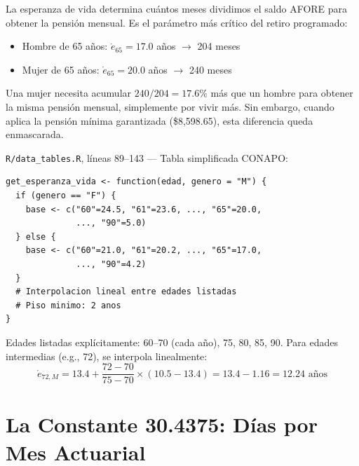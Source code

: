 \documentclass[11pt,a4paper]{report}
\theoremstyle{remark}
\begin{document}
\begin{tcolorbox}[colback=green!5!white, colframe=green!50!black, title=\textbf{Intuici\'on}]
La esperanza de vida determina cu\'antos meses dividimos el saldo AFORE para obtener la pensi\'on mensual. Es el par\'ametro m\'as cr\'itico del retiro programado:
\begin{itemize}
  \item Hombre de 65 a\~nos: $\mathring{e}_{65} = 17.0$ a\~nos $\to$ 204 meses
  \item Mujer de 65 a\~nos: $\mathring{e}_{65} = 20.0$ a\~nos $\to$ 240 meses
\end{itemize}

Una mujer necesita acumular $240/204 = 17.6\%$ m\'as que un hombre para obtener la misma pensi\'on mensual, simplemente por vivir m\'as. Sin embargo, cuando aplica la pensi\'on m\'inima garantizada (\$8,598.65), esta diferencia queda enmascarada.
\end{tcolorbox}

\begin{tcolorbox}[colback=orange!5!white, colframe=orange!75!black, title=\textbf{Aplicaci\'on en C\'odigo}]
\texttt{R/data\_tables.R}, l\'ineas 89--143 --- Tabla simplificada CONAPO:
\begin{lstlisting}
get_esperanza_vida <- function(edad, genero = "M") {
  if (genero == "F") {
    base <- c("60"=24.5, "61"=23.6, ..., "65"=20.0,
              ..., "90"=5.0)
  } else {
    base <- c("60"=21.0, "61"=20.2, ..., "65"=17.0,
              ..., "90"=4.2)
  }
  # Interpolacion lineal entre edades listadas
  # Piso minimo: 2 anos
}
\end{lstlisting}

Edades listadas expl\'icitamente: 60--70 (cada a\~no), 75, 80, 85, 90. Para edades intermedias (e.g., 72), se interpola linealmente:
\[
\mathring{e}_{72,M} = 13.4 + \frac{72 - 70}{75 - 70} \times (10.5 - 13.4) = 13.4 - 1.16 = 12.24 \text{ a\~nos}
\]
\end{tcolorbox}

\section{La Constante 30.4375: D\'ias por Mes Actuarial}
\end{document}
